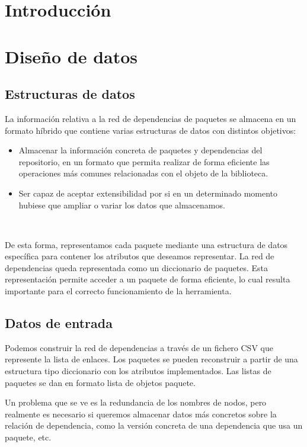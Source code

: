 
\section{Introducción}

\section{Diseño de datos}

\subsection{Estructuras de datos}
La información relativa a la red de dependencias de paquetes se almacena en un formato híbrido
que contiene varias estructuras de datos con distintos objetivos:

\begin{itemize}
    \item Almacenar la información concreta de paquetes y dependencias del repositorio, en un formato
          que permita realizar de forma eficiente las operaciones más comunes relacionadas con el objeto
          de la biblioteca.

    \item Ser capaz de aceptar extensibilidad por si en un determinado momento hubiese que ampliar
          o variar los datos que almacenamos.
\end{itemize}
\

De esta forma, representamos cada paquete mediante una estructura de datos específica para
contener los atributos que deseamos representar. La red de dependencias queda representada
como un diccionario de paquetes. Esta representación permite acceder a un paquete de forma
eficiente, lo cual resulta importante para el correcto funcionamiento de la herramienta.

\subsection{Datos de entrada}

Podemos construir la red de dependencias a través de un fichero CSV que represente la lista
de enlaces. Los paquetes se pueden reconstruir a partir de una estructura tipo diccionario
con los atributos implementados. Las listas de paquetes se dan en formato lista de objetos
paquete.

Un problema que se ve es la redundancia de los nombres de nodos, pero realmente es necesario
si queremos almacenar datos más concretos sobre la relación de dependencia, como la versión
concreta de una dependencia que usa un paquete, etc.

